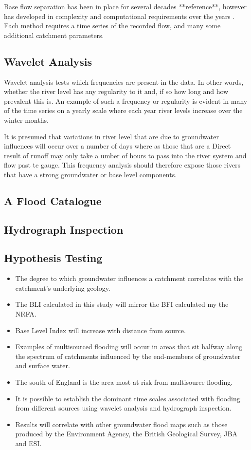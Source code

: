 \documentclass[DIV=calc, paper=a4, fontsize=11pt, twocolumn]{scrartcl}	 %
\begin{document}
Base flow separation has been in place for several decades **reference**, however has developed in complexity and computational requirements over the years \citep{Stadnyk2015}. Each method requires a time series of the recorded flow, and many some additional catchment parameters.


	\subsection*{Wavelet Analysis}
Wavelet analysis tests which frequencies are present in the data. In other words, whether the river level has any regularity to it and, if so how long and how prevalent this is. An example of such a frequency or regularity is evident in many of the time series on a yearly scale  where each year river levels increase over the winter months.

It is presumed that variations in river level that are due to groundwater influences will occur over a number of days where as those that are a Direct result of runoff may only take a umber of hours to pass into the river system and flow past te gauge. This frequency analysis should therefore expose those rivers that have a strong groundwater or base level components.

	\subsection*{A Flood Catalogue}
	\subsection*{Hydrograph Inspection}
	\subsection*{Hypothesis Testing}
		\begin{itemize}
			\item The degree to which groundwater influences a catchment correlates with the catchment's underlying geology.
			\item The BLI calculated in this study will mirror the BFI calculated my the NRFA.
			\item Base Level Index will increase with distance from source.
			\item Examples of multisourced flooding will occur in areas that sit halfway along the spectrum of catchments influenced by the end-members of groundwater and surface water.
			\item The south of England is the area most at risk from multisource flooding.
			\item It is possible to establish the dominant time scales associated with flooding from different sources using wavelet analysis and hydrograph inspection.
			\item Results will correlate with other groundwater flood maps such as those produced by the Environment Agency, the British Geological Survey, JBA and ESI.
		\end{itemize}
\end{document}
